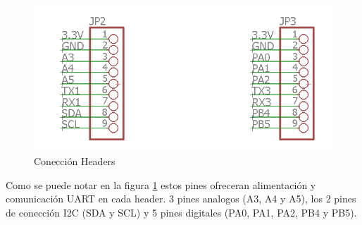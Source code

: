 \begin{figure}[H]
\centering
\includegraphics[scale=0.5]{figuras/eagle/header.png}
\caption{Conección Headers}
\label{header}
\end{figure}

Como se puede notar en la figura \ref{header} estos pines ofreceran alimentación y comunicación UART en cada header. 3 pines analogos (A3, A4 y A5), los 2 pines de conección I2C (SDA y SCL) y 5 pines digitales (PA0, PA1, PA2, PB4 y PB5).





